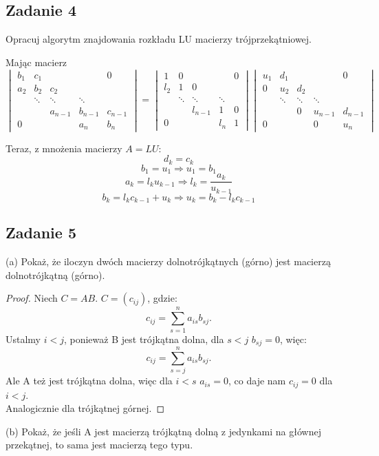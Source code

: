 \documentclass[a4paper]{article}
\begin{document}
\subsection*{Zadanie 4}
Opracuj algorytm znajdowania rozkładu LU macierzy trójprzekątniowej.

Mając macierz
$$\begin{vmatrix}
b_1 & c_1&&&0\\
a_2 & b_2 & c_2\\
& \ddots & \ddots & \ddots\\
&& a_{n-1} &b_{n-1} &c_{n-1}\\
0&&& a_n &b_n
\end{vmatrix} = \begin{vmatrix}
1 & 0&&&0\\
l_2 & 1 & 0\\
& \ddots & \ddots & \ddots\\
&& l_{n-1} &1 &0\\
0&&& l_n &1
\end{vmatrix}
\begin{vmatrix}
u_1 & d_1&&&0\\
0 & u_2 & d_2\\
& \ddots & \ddots & \ddots\\
&& 0 &u_{n-1} &d_{n-1}\\
0&&& 0 &u_n
\end{vmatrix}$$

Teraz, z mnożenia macierzy $A=LU$:
$$d_k=c_k$$
$$b_1=u_1 \Rightarrow u_1=b_1 $$
$$a_k=l_ku_{k-1} \Rightarrow l_k=\frac{a_k}{u_{k-1}}$$
$$b_k=l_kc_{k-1}+u_k \Rightarrow u_k=b_k-l_kc_{k-1} $$

\subsection*{Zadanie 5}
(a)
Pokaż, że iloczyn dwóch macierzy dolnotrójkątnych (górno) jest macierzą dolnotrójkątną (górno).
\begin{proof}

Niech $C=AB$. $C=(c_{ij})$, gdzie:
$$c_{ij}=\sum\limits_{s=1}^n a_{is}b_{sj}.$$
Ustalmy $i<j$, ponieważ B jest trójkątna dolna, dla $s<j$ $b_{sj}=0$, więc:
$$c_{ij}=\sum\limits_{s=j}^n a_{is}b_{sj}.$$
Ale A też jest trójkątna dolna, więc dla $i<s$ $a_{is}=0$, co daje nam $c_{ij}=0$ dla $i<j$.\\
Analogicznie dla trójkątnej górnej.

\end{proof}
(b)
Pokaż, że jeśli A jest macierzą trójkątną dolną z jedynkami na głównej przekątnej, to sama jest macierzą tego typu.
\end{document}
